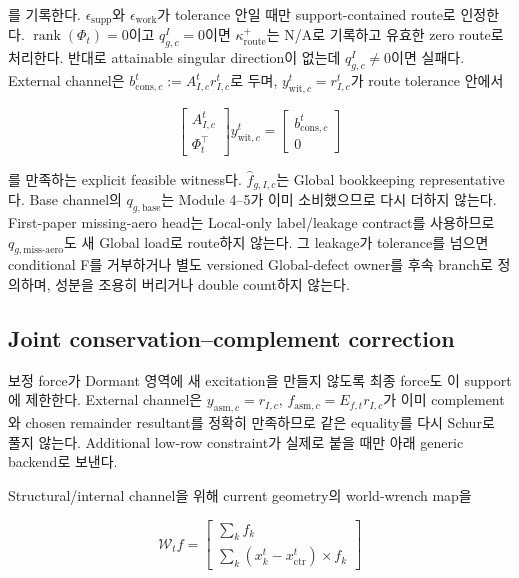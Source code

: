 \documentclass[11pt,a4paper]{article}
\begin{document}
를 기록한다. \(\epsilon_{\mathrm{supp}}\)와 \(\epsilon_{\mathrm{work}}\)가 tolerance 안일 때만
support-contained route로 인정한다. \(\operatorname{rank}(\Phi_t)=0\)이고
\(q_{g,c}^{I}=0\)이면 \(\kappa_{\mathrm{route}}^+\)는 N/A로 기록하고 유효한 zero route로 처리한다.
반대로 attainable singular direction이 없는데 \(q_{g,c}^{I}\ne0\)이면 실패다.
External channel은
\(b_{\mathrm{cons},c}^t:=A_{I,c}^tr_{I,c}^t\)로 두며,
\(y_{\mathrm{wit},c}^t=r_{I,c}^t\)가 route tolerance 안에서

\begin{equation}
  \begin{bmatrix}A_{I,c}^t\\\Phi_t^\top\end{bmatrix}
  y_{\mathrm{wit},c}^t
  =
  \begin{bmatrix}b_{\mathrm{cons},c}^t\\0\end{bmatrix}
  \label{eq:support-feasible-witness}
\end{equation}

를 만족하는 explicit feasible witness다. \(\widehat f_{g,I,c}\)는 Global bookkeeping
representative다. Base channel의 \(q_{g,\mathrm{base}}\)는 Module 4--5가 이미 소비했으므로
다시 더하지 않는다. First-paper missing-aero head는 Local-only label/leakage contract를 사용하므로
\(q_{g,\mathrm{miss\mbox{-}aero}}\)도 새 Global load로 route하지 않는다.
그 leakage가 tolerance를 넘으면 conditional F를 거부하거나 별도 versioned Global-defect owner를
후속 branch로 정의하며, 성분을 조용히 버리거나 double count하지 않는다.

\subsection*{Joint conservation--complement correction}

보정 force가 Dormant 영역에 새 excitation을 만들지 않도록 최종 force도 이 support에 제한한다.
External channel은 \(y_{\mathrm{asm},c}=r_{I,c}\),
\(f_{\mathrm{asm},c}=E_{f,t}r_{I,c}\)가 이미 complement와 chosen remainder resultant를
정확히 만족하므로 같은 equality를 다시 Schur로 풀지 않는다.
Additional low-row constraint가 실제로 붙을 때만 아래 generic backend로 보낸다.

Structural/internal channel을 위해 current geometry의 world-wrench map을

\begin{equation}
  \mathcal W_t f
  =
  \begin{bmatrix}
    \sum_k f_k\\[0.2em]
    \sum_k(x_k^t-x_{\mathrm{ctr}}^t)\times f_k
  \end{bmatrix}
  \label{eq:current-world-wrench-map}
\end{equation}
\end{document}
